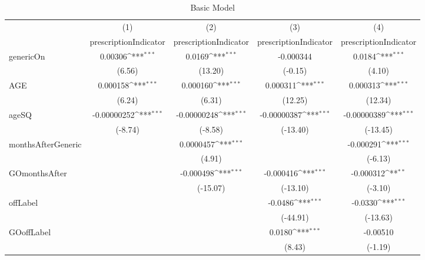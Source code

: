 \begin{table}[htbp]\centering
\def\sym#1{\ifmmode^{#1}\else\(^{#1}\)\fi}
\caption{Basic Model\label{tab1}}
\begin{tabular}{l*{4}{c}}
\hline\hline
            &\multicolumn{1}{c}{(1)}&\multicolumn{1}{c}{(2)}&\multicolumn{1}{c}{(3)}&\multicolumn{1}{c}{(4)}\\
            &\multicolumn{1}{c}{prescriptionIndicator}&\multicolumn{1}{c}{prescriptionIndicator}&\multicolumn{1}{c}{prescriptionIndicator}&\multicolumn{1}{c}{prescriptionIndicator}\\
\hline
genericOn   &     0.00306\sym{***}&      0.0169\sym{***}&   -0.000344         &      0.0184\sym{***}\\
            &      (6.56)         &     (13.20)         &     (-0.15)         &      (4.10)         \\
[1em]
AGE         &    0.000158\sym{***}&    0.000160\sym{***}&    0.000311\sym{***}&    0.000313\sym{***}\\
            &      (6.24)         &      (6.31)         &     (12.25)         &     (12.34)         \\
[1em]
ageSQ       & -0.00000252\sym{***}& -0.00000248\sym{***}& -0.00000387\sym{***}& -0.00000389\sym{***}\\
            &     (-8.74)         &     (-8.58)         &    (-13.40)         &    (-13.45)         \\
[1em]
monthsAfterGeneric&                     &   0.0000457\sym{***}&                     &   -0.000291\sym{***}\\
            &                     &      (4.91)         &                     &     (-6.13)         \\
[1em]
GOmonthsAfter&                     &   -0.000498\sym{***}&   -0.000416\sym{***}&   -0.000312\sym{**} \\
            &                     &    (-15.07)         &    (-13.10)         &     (-3.10)         \\
[1em]
offLabel    &                     &                     &     -0.0486\sym{***}&     -0.0330\sym{***}\\
            &                     &                     &    (-44.91)         &    (-13.63)         \\
[1em]
GOoffLabel  &                     &                     &      0.0180\sym{***}&    -0.00510         \\
            &                     &                     &      (8.43)         &     (-1.19)         \\

\end{tabular}
\end{table}
